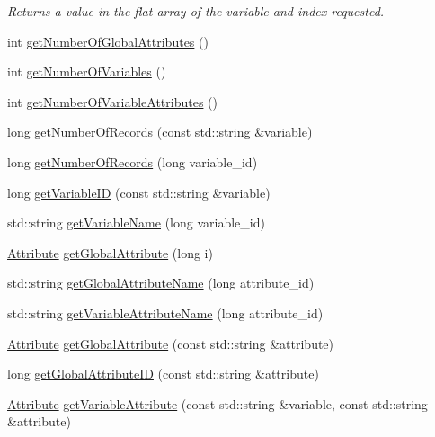 \begin{DoxyCompactItemize}
\begin{DoxyCompactList}\small\item\em Returns a value in the flat array of the variable and index requested. \end{DoxyCompactList}\item 
int \hyperlink{classccmc_1_1_c_d_f_file_reader_a881308df42ee5d273cb7364152f6970d}{get\-Number\-Of\-Global\-Attributes} ()
\item 
int \hyperlink{classccmc_1_1_c_d_f_file_reader_ae463cfe808dec21748a908b080c8bf81}{get\-Number\-Of\-Variables} ()
\item 
int \hyperlink{classccmc_1_1_c_d_f_file_reader_aeafab3428b6ca81a9142faee44b3069f}{get\-Number\-Of\-Variable\-Attributes} ()
\item 
long \hyperlink{classccmc_1_1_c_d_f_file_reader_adc8d27cd794641171674307330ebdc66}{get\-Number\-Of\-Records} (const std\-::string \&variable)
\item 
long \hyperlink{classccmc_1_1_c_d_f_file_reader_a97f59c4e9020eb48fa460ba74b9d2535}{get\-Number\-Of\-Records} (long variable\-\_\-id)
\item 
long \hyperlink{classccmc_1_1_c_d_f_file_reader_a7c6c138eb96e5562e3a17b1691208129}{get\-Variable\-I\-D} (const std\-::string \&variable)
\item 
std\-::string \hyperlink{classccmc_1_1_c_d_f_file_reader_a98ab0f21eb5bad8b9fc095d8c1347e24}{get\-Variable\-Name} (long variable\-\_\-id)
\item 
\hyperlink{classccmc_1_1_attribute}{Attribute} \hyperlink{classccmc_1_1_c_d_f_file_reader_af7d28ab77cd25e50fcf0c1a55908331a}{get\-Global\-Attribute} (long i)
\item 
std\-::string \hyperlink{classccmc_1_1_c_d_f_file_reader_a6e6e6be5271219f6a2a45c94c89630f7}{get\-Global\-Attribute\-Name} (long attribute\-\_\-id)
\item 
std\-::string \hyperlink{classccmc_1_1_c_d_f_file_reader_adc190bdf05f4d01b465a0ff314431ebb}{get\-Variable\-Attribute\-Name} (long attribute\-\_\-id)
\item 
\hyperlink{classccmc_1_1_attribute}{Attribute} \hyperlink{classccmc_1_1_c_d_f_file_reader_aeaffff44fdcad36ae26cd7b84ba39a61}{get\-Global\-Attribute} (const std\-::string \&attribute)
\item 
long \hyperlink{classccmc_1_1_c_d_f_file_reader_a79af95b7733b9f75fcb492a599751b3b}{get\-Global\-Attribute\-I\-D} (const std\-::string \&attribute)
\item 
\hyperlink{classccmc_1_1_attribute}{Attribute} \hyperlink{classccmc_1_1_c_d_f_file_reader_ad90a8f0f842e2dd8091c5883add375a6}{get\-Variable\-Attribute} (const std\-::string \&variable, const std\-::string \&attribute)

\end{DoxyCompactItemize}
